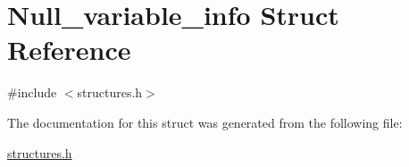 \hypertarget{structNull__variable__info}{}\section{Null\+\_\+variable\+\_\+info Struct Reference}
\label{structNull__variable__info}


{\ttfamily \#include $<$structures.\+h$>$}



The documentation for this struct was generated from the following file\+:\begin{DoxyCompactItemize}
\item 
\hyperlink{structures_8h}{structures.\+h}\end{DoxyCompactItemize}
